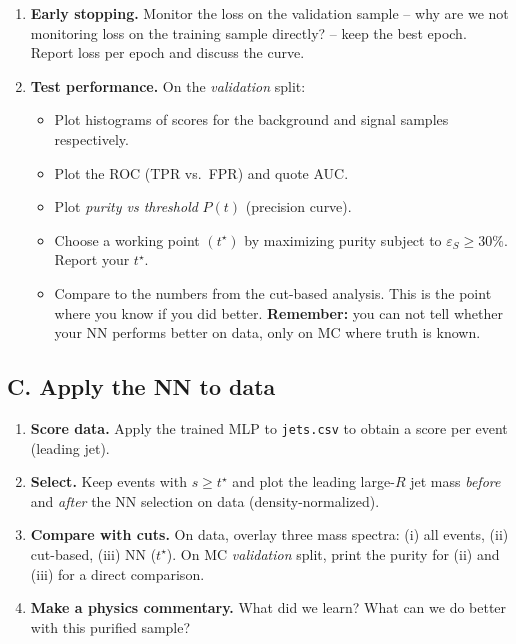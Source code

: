 \documentclass[11pt]{article}
\begin{document}
\begin{enumerate}[label=\textbf{B\arabic*.}]
  \item \textbf{Early stopping.} Monitor the loss on the validation sample -- why are we not monitoring loss on the training sample directly? -- keep the best epoch. Report loss per epoch and discuss the curve.
  \item \textbf{Test performance.} On the \emph{validation} split:
    \begin{itemize}[noitemsep]
      \item Plot histograms of scores for the background and signal samples respectively.
      \item Plot the ROC (TPR vs.\ FPR) and quote AUC.
      \item Plot \emph{purity vs threshold} $P(t)$ (precision curve). 
      \item Choose a working point $(t^\star)$ by maximizing purity subject to $\varepsilon_S \ge 30\%$. Report your $t^\star$.
      \item Compare to the numbers from the cut-based analysis. This is the point where you know if you did better. \textbf{Remember: }you can not tell whether your NN performs better on data, only on MC where truth is known.
    \end{itemize}
\end{enumerate}

\subsection*{C. Apply the NN to data}
\begin{enumerate}[label=\textbf{C\arabic*.}]
  \item \textbf{Score data.} Apply the trained MLP to \texttt{jets.csv} to obtain a score per event (leading jet).
  \item \textbf{Select.} Keep events with $s \ge t^\star$ and plot the leading large-$R$ jet mass \emph{before} and \emph{after} the NN selection on data (density-normalized).
  \item \textbf{Compare with cuts.} On data, overlay three mass spectra: (i) all events, (ii) cut-based, (iii) NN ($t^\star$). On MC \emph{validation} split, print the purity for (ii) and (iii) for a direct comparison.
  \item \textbf{Make a physics commentary.} What did we learn? What can we do better with this purified sample?
  
\end{enumerate}
\end{document}
